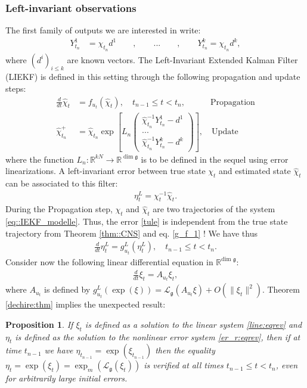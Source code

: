 \documentclass[a4paper,12pt,onecolumn]{article}
\newtheorem{prop}{Proposition}
\newcommand{\RR}{{\mathbb{R}}}
\newcommand{\norm}[1]{\lVert#1\rVert}
\newcommand{\dotex}{{\frac{d}{dt}}}
\begin{document}
\subsubsection{Left-invariant observations}
The first family of outputs we are interested in write:
\begin{align}\label{claude:eq}
Y^1_{t_n} & = \chi_{t_n} d^1  \qquad , \qquad
  ... \qquad , \qquad
Y^k_{t_n} = \chi_{t_n} d^k,
\end{align}
where $(d^i)_{i \leq k}$ are known vectors.  The Left-Invariant Extended Kalman Filter (LIEKF) is defined in this setting through the following propagation  and update steps:
\begin{align}
\frac{d}{dt}\hat{\chi}_t & = f_{u_t}(\hat{\chi}_t),\quad  t_{n-1}\leq t< t_n , \qquad\quad\text{Propagation} \label{IEKF_propagation} \\
\hat{\chi}_{t_n}^+ & = \hat{\chi}_{t_n} \exp \left[ L_n
\begin{pmatrix}
\hat{\chi}_{t_n}^{-1} Y_{t_n}^1- d^1 \\
... \\
\hat{\chi}_{t_n}^{-1} Y_{t_n}^k - d^k
\end{pmatrix} \right], \quad\text{Update} \label{LIEKF_update}
\end{align}where the function $L_n:\RR^{kN}\to \RR^{\dim \mathfrak{g}}$ is to be defined in the sequel using error linearizations. 
A left-invariant error between true state $\chi_t$ and estimated state $\hat \chi_t$ can be associated to this filter:
\begin{align}\label{tule}
\eta_t^L = \chi_t^{-1} \hat{\chi}_t.
\end{align}
During the Propagation step,  ${\chi}_t$ and $\hat{\chi}_t$ are two trajectories of the system \eqref{eq::IEKF_modelle}. Thus, the error \eqref{tule} is independent from the true state trajectory from Theorem \ref{thm::CNS} and eq. \eqref{g_f_1} ! We have thus
\begin{align}
\dotex\eta_t^L=g_{u_t}^L(\eta_t^L),\quad t_{n-1}\leq t<t_n.
\label{er_r:eqrev}
\end{align}Consider now the following linear differential equation in $\RR^{\text{dim }\mathfrak{g}}$: 
\begin{align}
\frac{d}{dt} \xi_t = A_{u_t}\xi_t ,  \label{line:eqrev}
\end{align}
where $A_{u_t}$ is defined by $g_{u_t}^L(\exp(\xi)) = \mathcal{L}_{\mathfrak{g}}(A_{u_t} \xi) + O(\norm{\xi_t}^2)$. Theorem \ref{dechire:thm} implies the unexpected result:
\begin{prop}\label{mrpror}If $\xi_t$ is defined as a solution to the  \emph{linear} system \eqref{line:eqrev} and  $\eta_t$ is defined as the solution to the \emph{nonlinear} error system \eqref{er_r:eqrev}, then if at time $t_{n-1}$  we have $\eta_{t_{n-1}}=\exp(\xi_{t_{n-1}})$ then the equality $\eta_t\label{expmap}=\exp(\xi_t)=\exp_m \left( \mathcal{L}_{\mathfrak{g}}({\xi}_t) \right)
$ is verified at all times $ t_{n-1}\leq t<t_n$, even for arbitrarily large initial errors.\end{prop}
\end{document}
